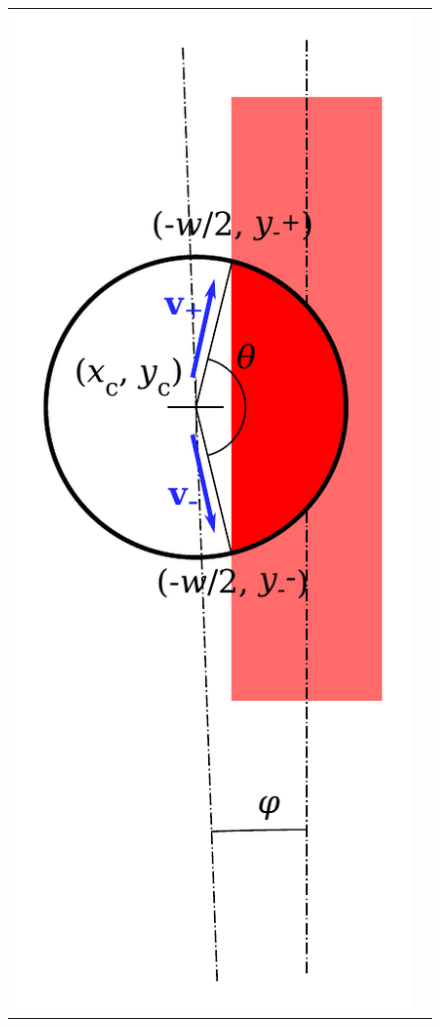 \documentclass[a4paper,11pt,article]{memoir}
\begin{document}
\begin{figure}
  \begin{center}
    \begin{tabular}{cc}
    \includegraphics[height=0.6\textheight]{overlap-2} &

\end{tabular}
\end{center}
\end{figure}
\end{document}

